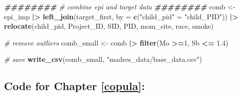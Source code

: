 \documentclass[12pt, twoside]{amherstthesis}
\newenvironment{Shaded}{\begin{snugshade}}{\end{snugshade}}
\newcommand{\AttributeTok}[1]{\textcolor[rgb]{0.13,0.29,0.53}{#1}}
\newcommand{\CommentTok}[1]{\textcolor[rgb]{0.56,0.35,0.01}{\textit{#1}}}
\newcommand{\DecValTok}[1]{\textcolor[rgb]{0.00,0.00,0.81}{#1}}
\newcommand{\DocumentationTok}[1]{\textcolor[rgb]{0.56,0.35,0.01}{\textbf{\textit{#1}}}}
\newcommand{\FloatTok}[1]{\textcolor[rgb]{0.00,0.00,0.81}{#1}}
\newcommand{\FunctionTok}[1]{\textcolor[rgb]{0.13,0.29,0.53}{\textbf{#1}}}
\newcommand{\NormalTok}[1]{#1}
\newcommand{\OtherTok}[1]{\textcolor[rgb]{0.56,0.35,0.01}{#1}}
\newcommand{\SpecialCharTok}[1]{\textcolor[rgb]{0.81,0.36,0.00}{\textbf{#1}}}
\newcommand{\StringTok}[1]{\textcolor[rgb]{0.31,0.60,0.02}{#1}}
\begin{document}
\begin{Shaded}
\begin{Highlighting}[]
\DocumentationTok{\#\#\#\#\#\#\#\#}
\CommentTok{\# combine epi and target data}
\DocumentationTok{\#\#\#\#\#\#\#\#}
\NormalTok{comb }\OtherTok{\textless{}{-}}\NormalTok{ epi\_imp }\SpecialCharTok{|\textgreater{}} 
  \FunctionTok{left\_join}\NormalTok{(target\_first, }\AttributeTok{by =} \FunctionTok{c}\NormalTok{(}\StringTok{"child\_pid"} \OtherTok{=} \StringTok{"child\_PID"}\NormalTok{)) }\SpecialCharTok{|\textgreater{}} 
  \FunctionTok{relocate}\NormalTok{(child\_pid, Project\_ID, SID, PID, mom\_site, race, smoke) }

\CommentTok{\# remove outliers}
\NormalTok{comb\_small }\OtherTok{\textless{}{-}}\NormalTok{ comb }\SpecialCharTok{|\textgreater{}} 
  \FunctionTok{filter}\NormalTok{(Mo }\SpecialCharTok{\textgreater{}=}\DecValTok{1}\NormalTok{, Sb }\SpecialCharTok{\textless{}=} \FloatTok{1.4}\NormalTok{)}

\CommentTok{\# save}
\FunctionTok{write\_csv}\NormalTok{(comb\_small, }\StringTok{"madres\_data/base\_data.csv"}\NormalTok{)}
\end{Highlighting}
\end{Shaded}
\hypertarget{code-for-chapter-refcopula}{%
\subsection{Code for Chapter \ref{copula}:}\label{code-for-chapter-refcopula}}
\end{document}

